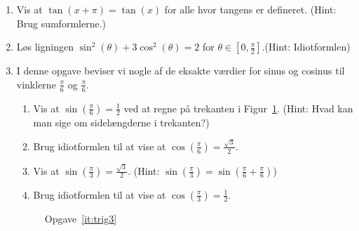 \begin{enumerate}
	\item Vis at $\tan(x+\pi)=\tan(x)$ for alle hvor tangens er defineret. (Hint: Brug sumformlerne.)
	
	\item Løs ligningen $\sin^2(\theta)+3\cos^2(\theta) =2$ for $\theta\in [0,\frac{\pi}{2}]$.(Hint: Idiotformlen)
	
	\item \label{it:trig3} I denne opgave beviser vi nogle af de eksakte værdier for sinus og cosinus til vinklerne $ \frac{\pi}{6}$ og $ \frac{\pi}{6} $.
	
	\begin{enumerate}
		\item Vis at $\sin(\frac{\pi}{6})=\frac{1}{2}$ ved at regne på trekanten i Figur~\ref{fig:trig3}. (Hint: Hvad kan man sige om sidelængderne i trekanten?)
		
		\item Brug idiotformlen til at vise at $\cos(\frac{\pi}{6})=\frac{\sqrt{3}}{2}$.
		
		\item Vis at $\sin(\frac{\pi}{3})=\frac{\sqrt{3}}{2}$. (Hint: $ \sin(\frac{\pi}{3})=\sin(\frac{\pi}{6}+\frac{\pi}{6}) $)
		
		\item Brug idiotformlen til at vise at $\cos(\frac{\pi}{3})=\frac{1}{2}$.
		
	\end{enumerate}
		
	\begin{figure}
		\centering
		\caption{Opgave~\ref{it:trig3}}
		\label{fig:trig3}
	\end{figure}


\end{enumerate}
